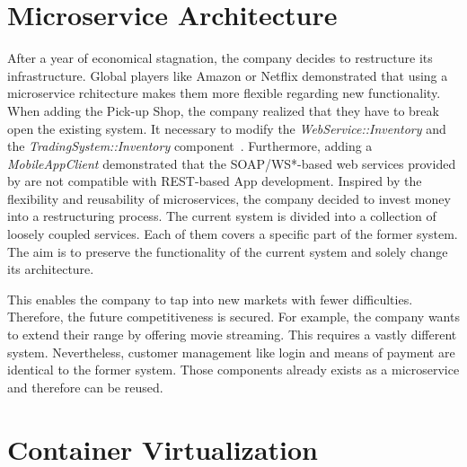 \section{Microservice Architecture}
After a year of economical stagnation, the \CoCoME company decides to restructure its infrastructure. 
Global players like Amazon or Netflix demonstrated that using a microservice rchitecture makes them more flexible regarding new functionality. 
When adding the Pick-up Shop, the \CoCoME company realized that they have to break open the existing system. 
It  necessary to modify the \textit{WebService::Inventory} and the \textit{TradingSystem::Inventory} component~\cite{HeinrichRostamiReussner2016_1000052688}. 
Furthermore, adding a \textit{MobileAppClient} demonstrated that the SOAP/WS*-based web services provided by \CoCoME are not compatible with REST-based App development.
Inspired by the flexibility and reusability of microservices, the \CoCoME company decided to invest money into a restructuring process. 
The current system is divided into a collection of loosely coupled services. Each of them covers a specific part of the former \CoCoME system. 
The aim is to preserve the functionality of the current system and solely change its architecture.

This enables the company to tap into new markets with fewer difficulties. 
Therefore, the future competitiveness is secured. 
For example, the \CoCoME company wants to extend their  range by offering movie streaming.%
This requires a vastly different system. 
Nevertheless, customer management like login and means of payment are identical to the former \CoCoME system. 
Those components already exists as a microservice and therefore can be reused. 


\section{Container Virtualization}

